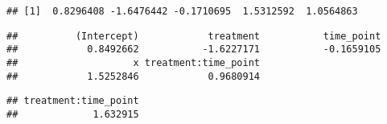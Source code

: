 \documentclass[
]{article}
\newenvironment{Shaded}{\begin{snugshade}}{\end{snugshade}}
\newcommand{\DecValTok}[1]{\textcolor[rgb]{0.00,0.00,0.81}{#1}}
\newcommand{\FunctionTok}[1]{\textcolor[rgb]{0.00,0.00,0.00}{#1}}
\newcommand{\NormalTok}[1]{#1}
\newcommand{\SpecialCharTok}[1]{\textcolor[rgb]{0.00,0.00,0.00}{#1}}
\begin{document}
\begin{verbatim}
## [1]  0.8296408 -1.6476442 -0.1710695  1.5312592  1.0564863
\end{verbatim}

\begin{Shaded}
\end{Shaded}

\begin{verbatim}
##          (Intercept)            treatment           time_point 
##            0.8492662           -1.6227171           -0.1659105 
##                    x treatment:time_point 
##            1.5252846            0.9680914
\end{verbatim}

\begin{Shaded}
\end{Shaded}

\begin{verbatim}
## treatment:time_point 
##             1.632915
\end{verbatim}
\end{document}
